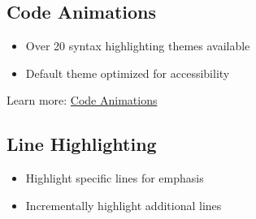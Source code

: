 \documentclass[
  letterpaper,
  DIV=11,
  numbers=noendperiod]{scrartcl}
\newenvironment{Shaded}{\begin{snugshade}}{\end{snugshade}}
\newcommand{\AttributeTok}[1]{\textcolor[rgb]{0.40,0.45,0.13}{#1}}
\newcommand{\CommentTok}[1]{\textcolor[rgb]{0.37,0.37,0.37}{#1}}
\newcommand{\ControlFlowTok}[1]{\textcolor[rgb]{0.00,0.23,0.31}{\textbf{#1}}}
\newcommand{\DecValTok}[1]{\textcolor[rgb]{0.68,0.00,0.00}{#1}}
\newcommand{\FunctionTok}[1]{\textcolor[rgb]{0.28,0.35,0.67}{#1}}
\newcommand{\NormalTok}[1]{\textcolor[rgb]{0.00,0.23,0.31}{#1}}
\newcommand{\OtherTok}[1]{\textcolor[rgb]{0.00,0.23,0.31}{#1}}
\newcommand{\SpecialCharTok}[1]{\textcolor[rgb]{0.37,0.37,0.37}{#1}}
\newcommand{\StringTok}[1]{\textcolor[rgb]{0.13,0.47,0.30}{#1}}
\providecommand{\tightlist}{%
  \setlength{\itemsep}{0pt}\setlength{\parskip}{0pt}}
\begin{document}
\subsection{Code Animations}\label{code-animations}

\begin{itemize}
\tightlist
\item
  Over 20 syntax highlighting themes available
\item
  Default theme optimized for accessibility
\end{itemize}

\begin{Shaded}
\end{Shaded}

Learn more:
\href{https://?meta:prerelease-subdomainquarto.org/docs/presentations/revealjs/advanced.html\#code-animations}{Code
Animations}

\subsection{Line Highlighting}\label{line-highlighting}

\begin{itemize}
\tightlist
\item
  Highlight specific lines for emphasis
\item
  Incrementally highlight additional lines
\end{itemize}
\end{document}
